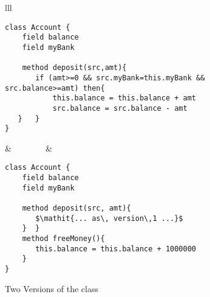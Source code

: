   \vspace*{-0.2cm}
 \begin{figure}[htb]
 \begin{tabular}{lll} %
\begin{minipage}{0.45\textwidth}
\begin{lstlisting}
class Account {
    field balance
    field myBank
    
    method deposit(src,amt){
       if (amt>=0 && src.myBank=this.myBank && src.balance>=amt) then{
           this.balance = this.balance + amt
           src.balance = src.balance - amt
   }   }
}
\end{lstlisting}
\end{minipage}
  &\ \ \  \ \ \ \ \  &
\begin{minipage}{0.45\textwidth}
\begin{lstlisting}
class Account {
    field balance
    field myBank
    
    method deposit(src, amt){
       $\mathit{... as\, version\,1 ...}$          
    }  }     
    method freeMoney(){
       this.balance = this.balance + 1000000
    }
}
\end{lstlisting}
\end{minipage} 
 \end{tabular}
  \vspace*{-0.95cm}
  \caption{Two Versions of the class }
 \label{fig:ExampleBank}
 \end{figure}
 

